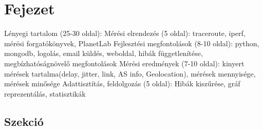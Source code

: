 \chapter{Fejezet}


Lényegi tartalom (25-30 oldal):
Mérési elrendezés (5 oldal): traceroute, iperf, mérési forgatókönyvek, PlanetLab
Fejlesztési megfontolások (8-10 oldal): python, mongodb, logolás, email küldés, weboldal, hibák függetlenítése, megbízhatóságnövelő megfontolások
Mérési eredmények (7-10 oldal): kinyert mérések tartalma(delay, jitter, link, AS info, Geolocation), mérések mennyisége, mérések minősége
Adattisztítás, feldolgozás (5 oldal): Hibák kiszűrése, gráf reprezentálás, statisztikák



\section{Szekció}


%
% 